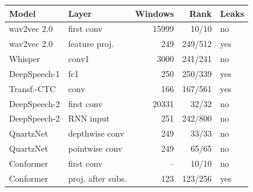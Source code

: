 \begin{tabular}{@{}llrrl@{}}
\toprule
Model & Layer & Windows & Rank & Leaks\\
\midrule
wav2vec 2.0 & first conv & 15999 & 10/10 & no\\
wav2vec 2.0 & feature proj. & 249 & 249/512 & yes\\
Whisper & conv1 & 3000 & 241/241 & no\\
DeepSpeech-1 & fc1 & 250 & 250/339 & yes\\
Transf.-CTC & conv & 166 & 167/561 & yes\\
DeepSpeech-2 & first conv & 20331 & 32/32 & no\\
DeepSpeech-2 & RNN input & 251 & 242/800 & no\\
QuartzNet & depthwise conv & 249 & 33/33 & no\\
QuartzNet & pointwise conv & 249 & 65/65 & no\\
Conformer & first conv & -- & 10/10 & no\\
Conformer & proj. after subs. & 123 & 123/256 & yes\\
\bottomrule
\end{tabular}
